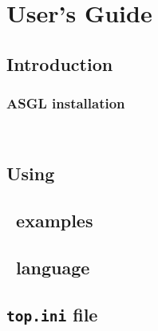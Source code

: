 \documentclass[11pt]{book}
\begin{document}
\frontmatter

\begin{titlepage}
  \maketitle
\end{titlepage}

\tableofcontents

\newpage

\mainmatter

\part{User's Guide}

\chapter{Introduction}

    

    \newpage

\section{ASGL installation}

    \begin{verbatim}
    
    \end{verbatim}

\newpage

\chapter{Using \ASGL} \label{CHAPTERASGL}

    

\newpage

\chapter{\ASGL\ examples} \label{CHAPTEREXAMPLES}
 
    {\small
    
    }

\newpage

\chapter{\TOP\ language} \label{CHAPTERTOP}
    

\newpage

\chapter{{\tt top.ini} file}

    \begin{verbatim}
    
    \end{verbatim}

\backmatter

% 
% 

\printindex
\end{document}
